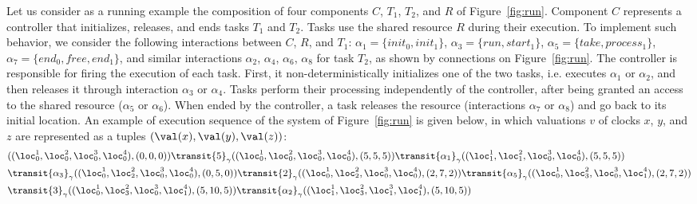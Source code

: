 
\begin{example}
  \label{exp:run}
  Let us consider as a running example the composition of four components $C$, $T_1$, $T_2$, and $R$ of Figure~\ref{fig:run}.
  Component $C$ represents a  controller that initializes, releases, and ends tasks $T_1$ and $T_2$.
  Tasks use the shared resource $R$ during their execution.
  To implement such behavior, we consider the following interactions between $C$, $R$, and $T_1$: $\alpha_1=\{init_0, init_1\}$,
    $\alpha_3=\{run, start_1\}$, $\alpha_5=\{ take, process_1\}$, $\alpha_7 = \{end_0, free, end_1 \}$, 
      and similar interactions $\alpha_2$, $\alpha_4$, $\alpha_6$, $\alpha_8$ for task $T_2$, 
      as shown by connections on Figure~\ref{fig:run}.
      The controller is responsible for firing
      the execution of each task. First, it non-deterministically initializes one
      of the two tasks, i.e. executes $\alpha_1$ or $\alpha_2$, and then
      releases it through interaction $\alpha_3$ or $\alpha_4$.
      Tasks perform their processing independently of the controller, after being granted an access to the shared resource ($\alpha_5$ or $\alpha_6$).
      When ended by the controller, a task releases the resource  (interactions $\alpha_7$ or $\alpha_8$) and go back to its initial location.
      An example of execution sequence of the system of Figure~\ref{fig:run} is given below, in which valuations $v$ of clocks $x$, $y$, and $z$ are represented as a tuples $(\val(x),\val(y),\val(z))$:
      \begin{displaymath}
        \small{
        \begin{split}
          &((\loc_0^1,\loc_0^2,\loc_0^3,\loc_0^4),(0,0,0))\transit{5}_{\gamma}((\loc_0^1,\loc_0^2,\loc_0^3,\loc_0^4),(5,5,5))\transit{\alpha_1}_{\gamma}((\loc_1^1,\loc_1^2,\loc_0^3,\loc_0^4),(5,5,5))\\
          &\transit{\alpha_3}_{\gamma}((\loc_0^1,\loc_2^2,\loc_0^3,\loc_0^4),(0,5,0))\transit{2}_{\gamma}((\loc_0^1,\loc_2^2,\loc_0^3,\loc_0^4),(2,7,2))\transit{\alpha_5}_{\gamma}
          ((\loc_0^1,\loc_3^2,\loc_0^3,\loc_1^4),(2,7,2))\\&\transit{3}_{\gamma}((\loc_0^1,\loc_3^2,\loc_0^3,\loc_1^4),(5,10,5))\transit{\alpha_2}_{\gamma}((\loc_1^1,\loc_3^2,\loc_1^3,\loc_1^4),
          (5,10,5))
        \end{split}
      }
      \end{displaymath}
    
\end{example}


